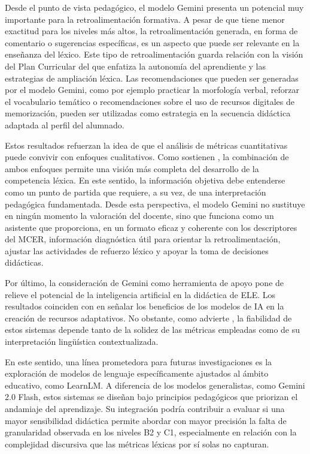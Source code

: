 \documentclass[spanish]{textolivre}
\begin{document}
Desde el punto de vista pedagógico, el modelo Gemini presenta un potencial muy importante para la retroalimentación formativa. A pesar de que tiene menor exactitud para los niveles más altos, la retroalimentación generada, en forma de comentario o sugerencias específicas, es un aspecto que puede ser relevante en la enseñanza del léxico. Este tipo de retroalimentación guarda relación con la visión del Plan Curricular del \textcite{instituto_cervantes2006} que enfatiza la autonomía del aprendiente y las estrategias de ampliación léxica. Las recomendaciones que pueden ser generadas por el modelo Gemini, como por ejemplo practicar la morfología verbal, reforzar el vocabulario temático o recomendaciones sobre el uso de recursos digitales de memorización, pueden ser utilizadas como estrategia en la secuencia didáctica adaptada al perfil del alumnado.

Estos resultados refuerzan la idea de que el análisis de métricas cuantitativas puede convivir con enfoques cualitativos. Como sostienen \textcite{vine_jara2021,jimenez_perez2024}, la combinación de ambos enfoques permite una visión más completa del desarrollo de la competencia léxica. En este sentido, la información objetiva debe entenderse como un punto de partida que requiere, a su vez, de una interpretación pedagógica fundamentada. Desde esta perspectiva, el modelo Gemini no sustituye en ningún momento la valoración del docente, sino que funciona como un asistente que proporciona, en un formato eficaz y coherente con los descriptores del MCER, información diagnóstica útil para orientar la retroalimentación, ajustar las actividades de refuerzo léxico y apoyar la toma de decisiones didácticas.

Por último, la consideración de Gemini como herramienta de apoyo pone de relieve el potencial de la inteligencia artificial en la didáctica de ELE. Los resultados coinciden con \textcite{degraeuwe_goethals2024} en señalar los beneficios de los modelos de IA en la creación de recursos adaptativos. No obstante, como advierte \textcite{hu2021}, la fiabilidad de estos sistemas depende tanto de la solidez de las métricas empleadas como de su interpretación lingüística contextualizada.

En este sentido, una línea prometedora para futuras investigaciones es la exploración de modelos de lenguaje específicamente ajustados al ámbito educativo, como LearnLM. A diferencia de los modelos generalistas, como Gemini 2.0 Flash, estos sistemas se diseñan bajo principios pedagógicos que priorizan el andamiaje del aprendizaje. Su integración podría contribuir a evaluar si una mayor sensibilidad didáctica permite abordar con mayor precisión la falta de granularidad observada en los niveles B2 y C1, especialmente en relación con la complejidad discursiva que las métricas léxicas por sí solas no capturan.
\end{document}

